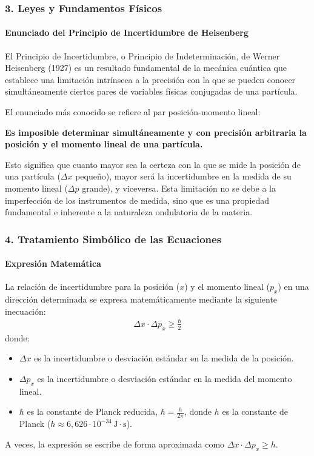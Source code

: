 \subsubsection*{3. Leyes y Fundamentos Físicos}
\paragraph*{Enunciado del Principio de Incertidumbre de Heisenberg}
El Principio de Incertidumbre, o Principio de Indeterminación, de Werner Heisenberg (1927) es un resultado fundamental de la mecánica cuántica que establece una limitación intrínseca a la precisión con la que se pueden conocer simultáneamente ciertos pares de variables físicas conjugadas de una partícula.

El enunciado más conocido se refiere al par posición-momento lineal:
\begin{cajaconclusion}
\textbf{Es imposible determinar simultáneamente y con precisión arbitraria la posición y el momento lineal de una partícula.}
\end{cajaconclusion}
\medskip
Esto significa que cuanto mayor sea la certeza con la que se mide la posición de una partícula ($\Delta x$ pequeño), mayor será la incertidumbre en la medida de su momento lineal ($\Delta p$ grande), y viceversa. Esta limitación no se debe a la imperfección de los instrumentos de medida, sino que es una propiedad fundamental e inherente a la naturaleza ondulatoria de la materia.

\subsubsection*{4. Tratamiento Simbólico de las Ecuaciones}
\paragraph*{Expresión Matemática}
La relación de incertidumbre para la posición ($x$) y el momento lineal ($p_x$) en una dirección determinada se expresa matemáticamente mediante la siguiente inecuación:
\begin{gather}
    \Delta x \cdot \Delta p_x \ge \frac{\hbar}{2}
\end{gather}
donde:
\begin{itemize}
    \item $\Delta x$ es la incertidumbre o desviación estándar en la medida de la posición.
    \item $\Delta p_x$ es la incertidumbre o desviación estándar en la medida del momento lineal.
    \item $\hbar$ es la constante de Planck reducida, $\hbar = \frac{h}{2\pi}$, donde $h$ es la constante de Planck ($h \approx 6,626 \cdot 10^{-34} \, \text{J}\cdot\text{s}$).
\end{itemize}
A veces, la expresión se escribe de forma aproximada como $\Delta x \cdot \Delta p_x \ge h$.


